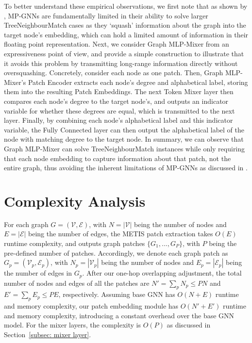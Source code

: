 \documentclass{article}
\begin{document}
To better understand these empirical observations, we first note that as shown by \citet{alon2020bottleneck}, MP-GNNs are fundamentally limited in their ability to solve larger TreeNeighbourMatch cases as they `squash' information about the graph into the target node's embedding, which can hold a limited amount of information in their floating point representation. Next, we consider Graph MLP-Mixer from an expressiveness point of view, and provide a simple construction to illustrate that it avoids this problem by transmitting long-range information directly without oversquashing. Concretely, consider each node as one patch. Then, Graph MLP-Mixer's Patch Encoder extracts each node's degree and alphabetical label, storing them into the resulting Patch Embeddings. The next Token Mixer layer then compares each node's degree to the target node's, and outputs an indicator variable for whether these degrees are equal, which is transmitted to the next layer. Finally, by combining each node's alphabetical label and this indicator variable, the Fully Connected layer can then output the alphabetical label of the node with matching degree to the target node. In summary, we can observe that Graph MLP-Mixer can solve TreeNeighbourMatch instances while only requiring that each node embedding to capture information about that patch, not the entire graph, thus avoiding the inherent limitations of MP-GNNs as discussed in \citep{alon2020bottleneck}.



\section{Complexity Analysis}\label{sec: complexity}
For each graph $G = (\mathcal{V}, \mathcal{E})$, with $N=|\mathcal{V}|$ being the number of nodes and $E = |\mathcal{E}|$ being the number of edges, the METIS patch extraction takes $O(E)$ runtime complexity, and outputs graph patches $\{G_1,...,G_P\}$, with $P$ being the pre-defined number of patches. Accordingly, we denote each graph patch as $G_p = (\mathcal{V}_p, \mathcal{E}_p)$, with $N_p=|\mathcal{V}_p|$ being the number of nodes and $E_p = |\mathcal{E}_p|$ being the number of edges in $G_p$.
After our one-hop overlapping adjustment, the total number of nodes and edges of all the patches are $N'=\sum_p N_p \le PN$ and $E' = \sum_p E_p \le PE$, respectively. Assuming base GNN has $O(N+E)$ runtime and memory complexity, our patch embedding module has $O(N'+E')$ runtime and memory complexity, introducing a constant overhead over the base GNN model. For the mixer layers, the complexity is $O(P)$ as discussed in Section~\ref{subsec: mixer layer}.
\end{document}
